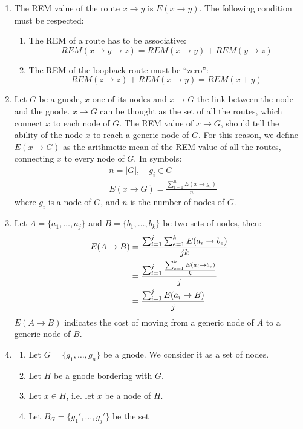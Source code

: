 \documentclass[a4paper]{article}
\begin{document}
\begin{enumerate}
	\item The REM value of the route $x\rightarrow y$ is $E(x\rightarrow
		y)$. The following condition must be respected:
		\begin{enumerate}
			\item 
		The REM of a route has to be associative:
		\[
		REM(x\rightarrow y\rightarrow z)=REM(x\rightarrow
		y)+REM(y\rightarrow z)
		\]
		\item The REM of the loopback route must be ``zero'':
			\[
			REM(z\rightarrow z)+REM(x\rightarrow y)=REM(x+y)
			\]
		\end{enumerate}
	\item Let $G$ be a gnode, $x$ one of its nodes and $x \rightarrow G$ the
		link between the node and the gnode. $x \rightarrow G$ can be
		thought as the set of all the routes, which connect $x$ to
		each node of $G$. The REM value of $x \rightarrow G$, should
		tell the ability of the node $x$ to reach a generic node of
		$G$. For this reason, we define $E(x \rightarrow G)$ as the
		arithmetic mean of the REM value of all the routes, connecting
		$x$ to every node of $G$. In symbols:
		\begin{align*}
		&n=|G|,\quad g_i\in G\\
		&E(x\rightarrow G)=\frac{\sum_{i=1}^n E(x \rightarrow g_i)}{n}
		\end{align*}
		where $g_i$ is a node of $G$, and $n$ is the number of nodes
		of $G$.
	\item Let $A=\{a_1, \dots,a_j\}$ and $B=\{b_1,\dots,b_k\}$ be two sets 
		of nodes, then:
		\begin{align*}
		E(A \rightarrow  B)&=
		\frac{\sum_{i=1}^j\sum_{e=1}^k E(a_i \rightarrow b_e)}{jk}\\
		&=
		\frac{\sum_{i=1}^j {\sum_{e=1}^k E(a_i \rightarrow b_e) \over
		k}}{j}\\
		&=
		\frac{\sum_{i=1}^j E(a_i \rightarrow B)}{j}
		\end{align*}
		$E(A \rightarrow B)$ indicates the cost of moving from a
		generic node of $A$ to a generic node of $B$.
	\item \label{p4}
		\begin{enumerate}
			\item Let $G=\{g_1,\dots,g_n\}$ be a gnode. We consider it as a set of
				nodes.
			\item Let $H$ be a gnode bordering with $G$.
			\item Let $x \in H$, i.e. let $x$ be a node of $H$.
			\item Let $B_G=\{g_1',\dots,g_j'\}$ be the set

\end{enumerate}
\end{enumerate}
\end{document}

